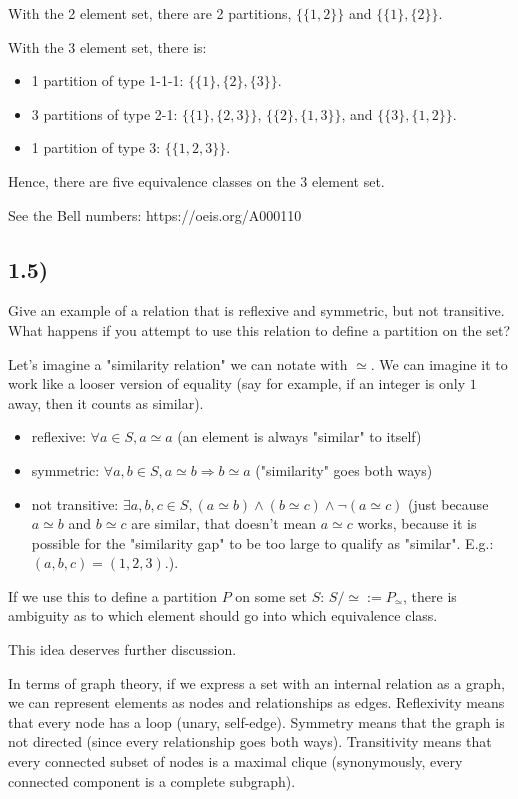 \documentclass[12pt, letterpaper, twoside]{report}
\begin{document}
With the 2 element set, there are 2 partitions, $\{\{1, 2\}\}$ and $\{\{1\}, \{2\}\}$.

With the 3 element set, there is:
\begin{itemize}
	\item 1 partition of type 1-1-1: $\{\{1\}, \{2\}, \{3\}\}$.
	\item 3 partitions of type 2-1: $\{\{1\}, \{2, 3\}\}$, $\{\{2\}, \{1, 3\}\}$, and $\{\{3\}, \{1, 2\}\}$.
	\item 1 partition of type 3: $\{\{1, 2, 3\}\}$.
\end{itemize}

Hence, there are five equivalence classes on the 3 element set.

See the Bell numbers: https://oeis.org/A000110



\subsection*{1.5)}

Give an example of a relation that is reflexive and symmetric, but not transitive. What happens if you attempt to use this relation to define a partition on the set?

Let's imagine a "similarity relation" we can notate with $\simeq$. We can imagine it to work like a looser version of equality (say for example, if an integer is only $1$ away, then it counts as similar).
\begin{itemize}
	\item reflexive: $\forall a \in S, a \simeq a$ (an element is always "similar" to itself)
	\item symmetric: $\forall a, b \in S, a \simeq b \Rightarrow b \simeq a$ ("similarity" goes both ways)
	\item not transitive: $\exists a, b, c \in S, (a \simeq b) \land (b \simeq c) \land \lnot (a \simeq c)$ (just because $a \simeq b$ and $b \simeq c$ are similar, that doesn't mean $a \simeq c$ works, because it is possible for the "similarity gap" to be too large to qualify as "similar". E.g.: $(a, b, c) = (1, 2, 3)$.).
\end{itemize}

If we use this to define a partition $P$ on some set $S$: $S/\simeq := P_\simeq$, there is ambiguity as to which element should go into which equivalence class.

This idea deserves further discussion.

In terms of graph theory, if we express a set with an internal relation as a graph, we can represent elements as nodes and relationships as edges. Reflexivity means that every node has a loop (unary, self-edge). Symmetry means that the graph is not directed (since every relationship goes both ways). Transitivity means that every connected subset of nodes is a maximal clique (synonymously, every connected component is a complete subgraph).
\end{document}
